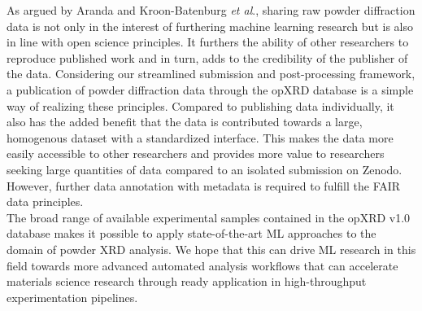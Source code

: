 As argued by Aranda and Kroon-Batenburg \textit{et al}.\cite{Aranda2018, Kroon-Batenburg2024}, sharing raw powder diffraction data is not only in the interest of furthering machine learning research but is also in line with open science principles. It furthers the ability of other researchers to reproduce published work and in turn, adds to the credibility of the publisher of the data. Considering our streamlined submission and post-processing framework, a publication of powder diffraction data through the opXRD database is a simple way of realizing these principles. Compared to publishing data individually, it also has the added benefit that the data is contributed towards a large, homogenous dataset with a standardized interface. This makes the data more easily accessible to other researchers and provides more value to researchers seeking large quantities of data compared to an isolated submission on Zenodo. However, further data annotation with metadata is required to fulfill the FAIR data principles.\\

The broad range of available experimental samples contained in the opXRD v1.0 database makes it possible to apply state-of-the-art ML approaches to the domain of powder XRD analysis. We hope that this can drive ML research in this field towards more advanced automated analysis workflows that can accelerate materials science research through ready application in high-throughput experimentation pipelines.\\